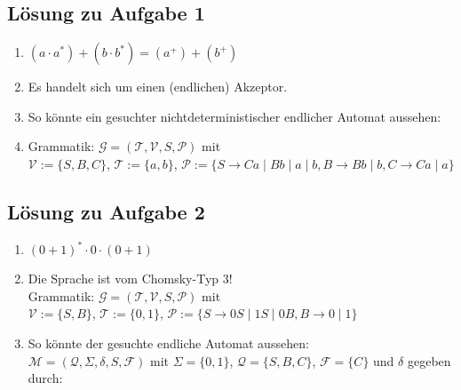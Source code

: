 \documentclass[10pt,oneside,onecolumn,a4paper,german,titlepage]{article}
\begin{document}
\subsection*{Lösung zu Aufgabe 1}
\begin{enumerate}
\item $(a \cdot a^*) + (b \cdot b^*)  = (a^+) + (b^+)$
\item Es handelt sich um einen (endlichen) Akzeptor.
\item So könnte ein gesuchter nichtdeterministischer endlicher Automat aussehen:
\begin{center}
\end{center}
\item Grammatik: $\mathcal{G} = (\mathcal{T},\mathcal{V},S,\mathcal{P})$ mit\\
$\mathcal{V} := \{S,B,C\}$, $\mathcal{T} := \{a,b\}$,
$\mathcal{P} := \{S \rightarrow Ca \; | \; Bb \; | \; a \; | \; b,
B \rightarrow Bb \; | \; b, C \rightarrow Ca \; | \; a\}$
\end{enumerate}

\subsection*{Lösung zu Aufgabe 2}
\begin{enumerate}
\item $(0+1)^* \cdot 0 \cdot (0+1)$
\item Die Sprache ist vom Chomsky-Typ 3!\\
Grammatik: $\mathcal{G}=(\mathcal{T},\mathcal{V},S,\mathcal{P})$ mit\\
$\mathcal{V} := \{S,B\}$, $\mathcal{T} := \{0,1\}$,
$\mathcal{P} := \{S \rightarrow 0S \; | \; 1S \; | \; 0B, B \rightarrow 0 \; | \; 1\}$
\item So könnte der gesuchte endliche Automat aussehen:\\
$\mathcal{M} = (\mathcal{Q},\Sigma,\delta,S,\mathcal{F})$ mit
$\Sigma = \{0,1\}$, $\mathcal{Q} = \{S,B,C\}$, $\mathcal{F} = \{C\}$
und $\delta$ gegeben durch:
\begin{center}
\end{center}
\end{enumerate}
\newpage
\end{document}

